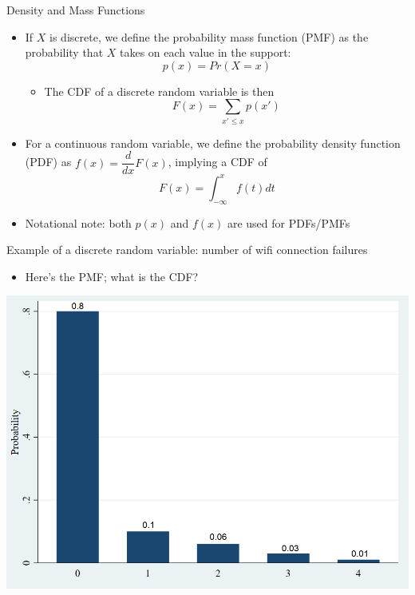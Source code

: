 \documentclass[11pt,english,handout]{beamer}
\begin{document}
\begin{frame}{Density and Mass Functions}

\begin{itemize}
	\item 
	If $X$ is discrete, we define the probability mass function (PMF) as the probability that $X$ takes on each value in the support: 
	\vspace{-0.2cm}
	$$p(x) = Pr(X =x )$$
	\pause
\vspace{-0.4cm}
	\begin{itemize}
	\item
	The CDF of a discrete random variable is then
	$$F(x) = \sum_{x' \leq x} p(x') $$ 
	\end{itemize}

	\pause
	\item
	For a continuous random variable, we define the probability density function (PDF) as $f(x) = \dfrac{d}{dx} F(x)$, implying a CDF of 
	$$F(x) = \int_{-\infty}^{x} f(t) dt$$
	
	\pause
	\item
	Notational note: both $p(x)$ and $f(x)$ are used for PDFs/PMFs
\end{itemize}

\end{frame}


\begin{frame}{}
\vspace{0.2cm}
Example of a discrete random variable: number of wifi connection failures 

\begin{itemize}
\item Here's the PMF; what is the CDF?
\end{itemize}

\begin{center}
\includegraphics[scale=0.35]{simple_pmf.png}
\end{center}

\end{frame}
\end{document}
